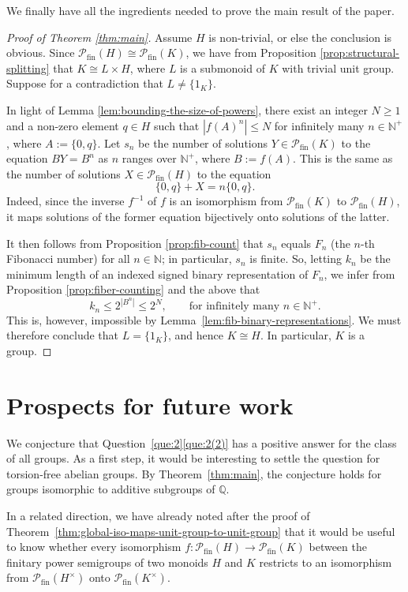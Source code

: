 \documentclass[11pt,reqno]{amsart}
\theoremstyle{definition}
\theoremstyle{remark}
\theoremstyle{theoremdd}
\newcommand{\fin}{\mathrm{fin}}
\renewcommand{\,}{\kern 0.1em}
\begin{document}
We finally have all the ingredients needed to prove the main result of the paper.

\begin{proof}[Proof of Theorem \ref{thm:main}]
Assume $H$ is non-trivial, or else the conclusion is obvious. Since $\mathcal P_\fin(H) \cong \mathcal P_\fin(K)$, we have from Proposition \ref{prop:structural-splitting} that $K \cong L \times H$, where $L$ is a submonoid of $K$ with trivial unit group. Suppose for a contradiction that $L \ne \{1_K\}$. 

In light of Lemma
\ref{lem:bounding-the-size-of-powers}, there exist an integer $N \ge 1$ and a non-zero element $q \in H$ such that $|f(A)^n| \le N$ for infinitely many $n \in \mathbb N^+$, where $A := \{0, q\}$. Let $s_n$ be the number of solutions $Y \in \allowbreak \mathcal P_\fin(K)$ to the equation $
BY = B^n$ as $n$ ranges over $\mathbb N^+$, where $B := f(A)$. This is the same as the number of solutions $X \in \mathcal P_\fin(H)$ to the equation
\[
\{0, q\} + X = n\{0, q\}.
\]
Indeed, since the inverse $f^{-1}$ of $f$ is an isomorphism from
$\mathcal P_\fin(K)$ to $\mathcal P_\fin(H)$, it maps solutions of the
former equation bijectively onto solutions of the latter.

It then follows from Proposition \ref{prop:fib-count} that $s_n$ equals $F_n$ (the $n$-th Fibonacci number) for all $n \in \mathbb N$; in particular, $s_n$ is finite. So, letting $k_n$ be the minimum length of an indexed signed binary representation of $F_n$, we infer from Proposition \ref{prop:fiber-counting} and the above that 
\[
k_n \le 2^{|B^n|} \le 2^{N},
\qquad\text{for infinitely many }
n \in \mathbb N^+.
\]
This is, however, impossible by
Lemma~\ref{lem:fib-binary-representations}. We must therefore conclude that
$L = \{1_K\}$, and hence $K \cong H$. In particular, $K$ is a group.
\end{proof}
\section{Prospects for future work}

We conjecture that Question~\ref{que:2}\ref{que:2(2)} has a positive answer for the class of all groups. As a first step, it would
be interesting to settle the question for torsion-free abelian groups.
By Theorem~\ref{thm:main}, the conjecture holds for groups isomorphic
to additive subgroups of $\mathbb Q$.

In a related direction, we have already noted after the proof of
Theorem~\ref{thm:global-iso-maps-unit-group-to-unit-group} that it would
be useful to know whether every isomorphism
$f \colon \mathcal P_{\fin}(H) \to \mathcal P_{\fin}(K)$ between the
finitary power semigroups of two monoids $H$ and $K$ restricts to an
isomorphism from $\mathcal P_{\fin}(H^\times)$ onto
$\mathcal P_{\fin}(K^\times)$.
\end{document}
